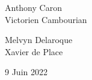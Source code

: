 \begin{titlepage}
\begin{sffamily}
\begin{center}
    \begin{minipage}{0.4\textwidth}
      \begin{flushleft} \large
        Anthony Caron\\
        Victorien Cambourian\\
      \end{flushleft}
    \end{minipage}
    \begin{minipage}{0.4\textwidth}
      \begin{flushright} \large
        Melvyn Delaroque\\
        Xavier de Place\\
      \end{flushright}
    \end{minipage}

    \vfill

    {\large 9 Juin 2022}

  \end{center}
  \end{sffamily}
\end{titlepage}
